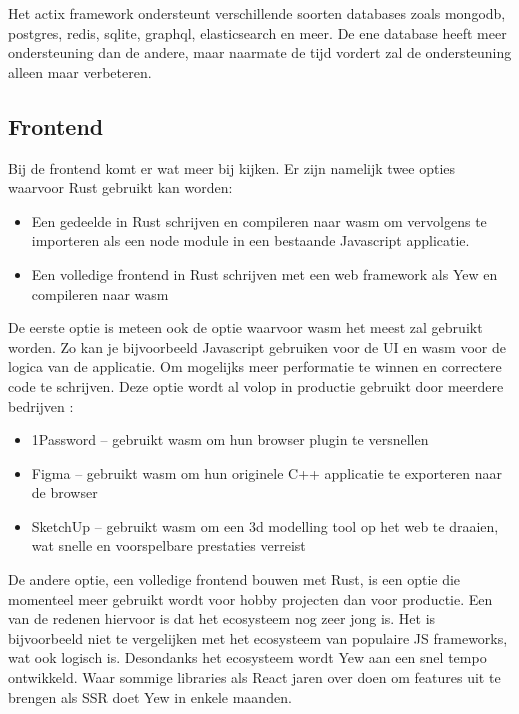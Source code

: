Het actix framework ondersteunt verschillende soorten databases zoals mongodb, postgres, redis,
sqlite, graphql, elasticsearch en meer. De ene database heeft meer ondersteuning dan de andere, maar
naarmate de tijd vordert zal de ondersteuning alleen maar verbeteren. 

\subsection{Frontend}

Bij de frontend komt er wat meer bij kijken. Er zijn namelijk twee opties waarvoor Rust gebruikt kan
worden: 
\begin{itemize}
  \item Een gedeelde in Rust schrijven en compileren naar wasm om vervolgens te importeren als een node
    module in een bestaande Javascript applicatie. 
  \item Een volledige frontend in Rust schrijven met een web framework als Yew en compileren naar wasm 
\end{itemize}               

\clearpage

De eerste optie is meteen ook de optie waarvoor wasm het meest zal gebruikt worden. Zo kan je
bijvoorbeeld Javascript gebruiken voor de UI en wasm voor de logica van de applicatie. Om mogelijks
meer performatie te winnen en correctere code te schrijven. Deze optie wordt al volop in productie
gebruikt door meerdere bedrijven \cite{made_with_wasm}: 
\begin{itemize}
  \item 1Password – gebruikt wasm om hun browser plugin te versnellen 
  \item Figma – gebruikt wasm om hun originele C++ applicatie te exporteren naar de browser 
  \item SketchUp – gebruikt wasm om een 3d modelling tool op het web te draaien, wat snelle en
    voorspelbare prestaties verreist 
\end{itemize}

De andere optie, een volledige frontend bouwen met Rust, is een optie die momenteel meer gebruikt
wordt voor hobby projecten dan voor productie. Een van de redenen hiervoor is dat het ecosysteem nog
zeer jong is. Het is bijvoorbeeld niet te vergelijken met het ecosysteem van populaire JS
frameworks, wat ook logisch is. Desondanks het ecosysteem wordt Yew aan een snel tempo ontwikkeld.
Waar sommige libraries als React jaren over doen om features uit te brengen als SSR doet Yew in
enkele maanden.

